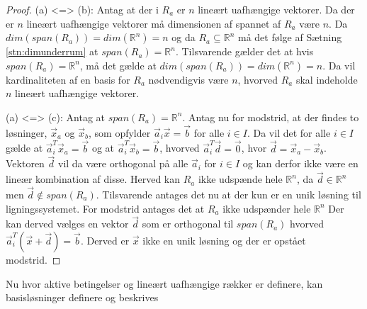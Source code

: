 \begin{proof}
	(a) <=> (b): Antag at der i $R_a$ er $n$ lineært uafhængige vektorer. Da der er $n$ lineært uafhængige vektorer må dimensionen af spannet af $R_a$ være $n$. Da $dim(span(R_a))=dim(\mathds{R}^n)=n$ og da $R_a \subseteq \mathds{R}^n$ må det følge af Sætning \ref{stn:dimunderrum} at $span(R_a)=\mathds{R}^n$. Tilsvarende gælder det at hvis $span(R_a)=\mathds{R}^n$, må det gælde at $dim(span(R_a))=dim(\mathds{R}^n)=n$. Da vil kardinaliteten af en basis for $R_a$ nødvendigvis være $n$, hvorved $R_a$ skal indeholde $n$ lineært uafhængige vektorer.


(a) <=> (c): Antag at $span(R_a)=\mathds{R}^n$. Antag nu for modstrid, at der findes to løsninger, $\vec{x}_a$ og $\vec{x}_b$, som opfylder $\vec{a}_i\vec{x}=\vec{b}$ for alle $i \in I$. 
Da vil det for alle $i \in I$ gælde at $\vec{a}_i^T\vec{x}_a=\vec{b}$ og at $\vec{a}_i^T\vec{x}_b=\vec{b}$, hvorved $\vec{a}_i^T\vec{d}=\vec{0}$, hvor $\vec{d}=\vec{x}_a-\vec{x}_b$. 
Vektoren $\vec{d}$ vil da være orthogonal på alle $\vec{a}_i$ for $i \in I$ og kan derfor ikke være en lineær kombination af disse. Herved kan $R_a$ ikke udspænde hele $\mathds{R}^n$, da $\vec{d} \in \mathds{R}^n$ men $\vec{d} \notin span(R_a)$.
Tilsvarende antages det nu at der kun er en unik løsning til ligningssystemet. For modstrid antages det at $R_a$ ikke udspænder hele $\mathds{R}^n$ Der kan derved vælges en vektor $\vec{d}$ som er orthogonal til $span(R_a)$ hvorved $\vec{a}_i^T(\vec{x}+\vec{d})=\vec{b}$. Derved er $\vec{x}$ ikke en unik løsning og der er opstået modstrid.
\end{proof}
	
Nu hvor aktive betingelser og lineært uafhængige rækker er definere, kan basisløsninger definere og beskrives

